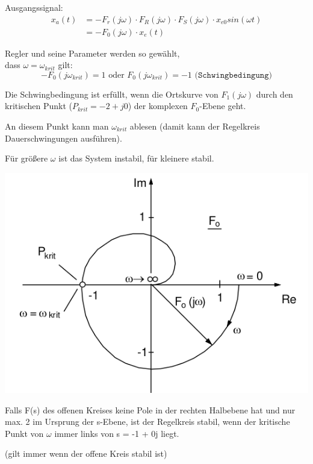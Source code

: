 \documentclass[10pt,a4paper]{article}
\begin{document}
Ausgangssignal:
\begin{align*}
    x_a(t) & =-F_r (j\omega) \cdot F_R (j\omega) \cdot F_S (j\omega) \cdot
    x_{e0}sin(\omega t) \\
	       & = -F_0 (j\omega) \cdot x_e (t)
\end{align*}

Regler und seine Parameter werden so gewählt,\\ dass $\omega = \omega_{krit}$ gilt:
\[
	-F_0 (j\omega_{krit})=1 \text{ oder } F_0 (j\omega_{krit})=-1 \texttt{ (Schwingbedingung)}
\]

\begin{mdframed}[style=exercise]
    Die Schwingbedingung ist erfüllt, wenn die Ortskurve von $F_1 (j\omega)$
    durch den kritischen Punkt ($P_{krit} = -2+j0$) der komplexen $F_0$-Ebene
    geht.

    An diesem Punkt kann man $\omega_{krit}$ ablesen (damit kann der Regelkreis
    Dauerschwingungen ausführen).

    Für größere $\omega$ ist das System instabil, für kleinere stabil.
\end{mdframed}

\includegraphics[width=0.94\columnwidth]{Figures/Nyquistwkrit.png}

\begin{mdframed}[style=exercise]
    Falls F(s) des offenen Kreises keine Pole in der rechten Halbebene hat und
    nur max. 2 im Ursprung der s-Ebene, ist der Regelkreis stabil, wenn der
    kritische Punkt von $\omega$ immer links von s = -1 + 0j liegt.

    \footnotesize
    (gilt immer wenn der offene Kreis stabil ist)
\end{mdframed}
\end{document}
